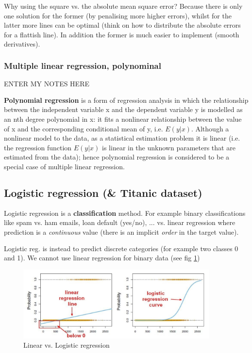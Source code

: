 \documentclass[11pt]{article}
\begin{document}
Why using the square vs. the absolute mean square error? Because there is only one solution for the former (by penalising more higher errors), whilst for the latter more lines can be optimal (think on how to distribute the absolute errors for a flattish line). In addition the former is much easier to implement (smooth derivatives).


\subsubsection{Multiple linear regression, polynominal} 
ENTER MY NOTES HERE

\textbf{Polynomial regression} is a form of regression analysis in which the relationship between the independent variable x and the dependent variable y is modelled as an nth degree polynomial in x: it  fits a nonlinear relationship between the value of x and the corresponding conditional mean of y, i.e. $E(y|x)$. Although a nonlinear model to the data, as a statistical estimation problem it is linear (i.e. the regression function  $E(y|x)$ is linear in the unknown parameters that are estimated from the data); hence polynomial regression is considered to be a special case of multiple linear regression.

\subsection{Logistic regression (\& Titanic dataset)} \label{titanic}
Logistic regression is a \textbf{classification} method. For example binary classifications like spam vs. ham emails, loan default (yes/no), ... 
vs. linear regression where prediction is a \textit{continuous} value (there is an implicit \textit{order} in the target value). 

Logistic reg. is instead to predict discrete categories (for example two classes 0 and 1). We cannot use linear regression for binary data (see fig \ref{lin_log_regr})


\begin{figure}[htbp] 
	\centering
	\includegraphics[width=0.9\textwidth]{pics/logistic_regression}
	\caption{Linear vs. Logistic regression} 
	\label{lin_log_regr}
\end{figure}
\end{document}
